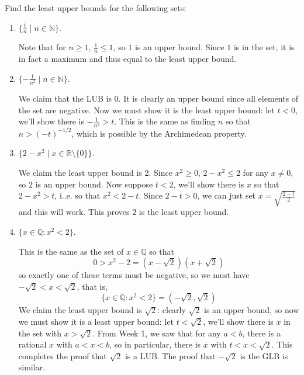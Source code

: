 \documentclass[11pt,dvipsnames]{book}
\def\R{\mathbb{R}}
\numberwithin{equation}{section} %
\numberwithin{figure}{section} %
\numberwithin{table}{section} %
\begin{document}
\begin{exercise}
Find the least upper bounds for the following sets:
\begin{enumerate}[label=(\alph*)]
\item $\{\frac{1}{n} \; | \; n\in \mathbb{N}\}$.
\begin{solution}
Note that for $n\geq 1$, $\frac{1}{n}\leq 1$, so $1$ is an upper bound. Since $1$ is in the set, it is in fact a maximum and thus equal to the least upper bound.
\end{solution}
\item $\{-\frac{1}{n^2} \; | \; n\in\mathbb{N}\}$. 
\begin{solution}
We claim that the LUB is $0$. It is clearly an upper bound since all elements of the set are negative. Now we must show it is the least upper bound: let $t<0$, we'll show there is $-\frac{1}{n^2}>t$. This is the same as finding $n$ so that $n>(-t)^{-1/2}$, which is possible by the Archimedean property.
\end{solution}
\item $\{2-x^2 \; | \; x\in \R\setminus\{0\}\}$.
\begin{solution}
We claim the least upper bound is 2. Since $x^2\geq 0$, $2-x^2\leq 2$ for any $x\neq 0$, so $2$ is an upper bound. Now suppose $t<2$, we'll show there is $x$ so that $2-x^2>t$, i..e. so that $x^2<2-t$. Since $2-t>0$, we can just set $x=\sqrt{\frac{2-t}{2}}$ and this will work. This proves $2$ is the least upper bound.
\end{solution}
\item $\{x\in\mathbb{Q}: x^2<2\}$.
\begin{solution}
This is the same  as the set of $x\in\mathbb{Q}$ so that 
\[
0>x^2-2=(x-\sqrt{2})(x+\sqrt{2})
\]
so exactly one of these terms must be negative, so we must have $-\sqrt{2}<x<\sqrt{2}$, that is, 
\[
\{x\in\mathbb{Q}: x^2<2\}=(-\sqrt{2},\sqrt{2})
\]
We claim the least upper bound is $\sqrt{2}$: clearly $\sqrt{2}$ is an upper bound, so now we must show it is a least upper bound: let $t<\sqrt{2}$, we'll show there is $x$ in the set with $x>\sqrt{2}$. From Week 1, we saw that for any $a<b$, there is a rational $x$ with $a<x<b$, so in particular, there is $x$ with $t<x<\sqrt{2}$. This completes the proof that $\sqrt{2}$ is a LUB. The proof that $-\sqrt{2}$ is the GLB is similar.
\end{solution}
\end{enumerate}

\end{exercise}
\end{document}
